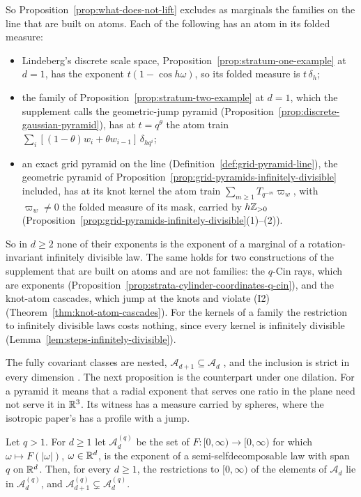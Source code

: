 So Proposition~\ref{prop:what-does-not-lift} excludes as marginals the families on the line that are
built on atoms. Each of the following has an atom in its folded \Levy{} measure:
\begin{itemize}
\item Lindeberg's discrete scale space, Proposition~\ref{prop:stratum-one-example} at $d = 1$, has
the exponent $t(1 - \cos h\omega)$, so its folded \Levy{} measure is $t\,\delta_h$;
\item the family of Proposition~\ref{prop:stratum-two-example} at $d = 1$, which the supplement calls
the geometric-jump pyramid (Proposition~\ref{prop:discrete-gaussian-pyramid}), has at
$t = q^\theta$ the atom train $\sum_i[(1 - \theta)w_i + \theta w_{i-1}]\,\delta_{hq^i}$;
\item an exact grid pyramid on the line (Definition~\ref{def:grid-pyramid-line}), the geometric
pyramid of Proposition~\ref{prop:grid-pyramids-infinitely-divisible} included, has at its knot
kernel the atom train $\sum_{m \ge 1}T_{q^{-m}}\varpi_w$, with $\varpi_w \ne 0$ the folded \Levy{}
measure of its mask, carried by $h\mathbb{Z}_{>0}$
(Proposition~\ref{prop:grid-pyramids-infinitely-divisible}(1)--(2)).
\end{itemize}
So in $d \ge 2$ none of their exponents is the exponent of a marginal of a rotation-invariant
infinitely divisible law. The same holds for two constructions of the
supplement that are built on atoms and are not families: the $q$-Cin rays, which are exponents
(Proposition~\ref{prop:strata-cylinder-coordinates-q-cin}), and the knot-atom cascades, which jump at
the knots and violate (I2) (Theorem~\ref{thm:knot-atom-cascades}). For the kernels of a family the
restriction to infinitely divisible laws costs nothing, since every kernel is infinitely divisible
(Lemma~\ref{lem:steps-infinitely-divisible}).

The fully covariant classes are nested, $\mathcal{A}_{d+1} \subseteq \mathcal{A}_d$
, and the inclusion is strict in every dimension
. The next proposition is the counterpart under one dilation.
For a pyramid it means that a radial exponent that serves one ratio in the plane need not serve it
in $\mathbb{R}^3$. Its witness has a \Levy{} measure carried by spheres, where the isotropic paper's has a
profile with a jump.

\begin{proposition}
\label{prop:what-does-not-lift-chain}

Let $q > 1$. For $d \ge 1$ let $\mathcal{A}^{(q)}_d$ be the set of $F : [0,\infty) \to [0,\infty)$
for which $\omega \mapsto F(|\omega|)$, $\omega \in \mathbb{R}^d$, is the exponent of a
semi-selfdecomposable law with span $q$ on $\mathbb{R}^d$. Then, for every $d \ge 1$,
the restrictions to $[0,\infty)$ of the elements of $\mathcal{A}_d$ lie in $\mathcal{A}^{(q)}_d$,
and $\mathcal{A}^{(q)}_{d+1} \subsetneq \mathcal{A}^{(q)}_d$.
\end{proposition}

